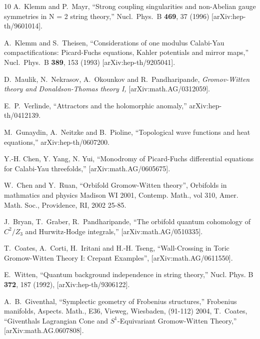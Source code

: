 \documentclass[12pt]{article}
\begin{document}
\begin{thebibliography}{10}
  A.~Klemm and P.~Mayr,
   ``Strong coupling singularities and non-Abelian gauge symmetries in  N = 2
  string theory,'' Nucl.\ Phys.\ B {\bf 469}, 37 (1996)
  [arXiv:hep-th/9601014].



 A.~Klemm and S.~Theisen,
   ``Considerations of one modulus Calabi-Yau compactifications: Picard-Fuchs
   equations, Kahler potentials and mirror maps,''
  Nucl.\ Phys.\ B {\bf 389}, 153 (1993)
  [arXiv:hep-th/9205041].

 D.~Maulik, N.~Nekrasov, A.~Okounkov and R.~Pandharipande,
        {\sl Gromov-Witten theory and Donaldson-Thomas theory I,}
        [arXiv:math.AG/0312059].



  E.~P.~Verlinde,
  ``Attractors and the holomorphic anomaly,''
  arXiv:hep-th/0412139.



  M.~Gunaydin, A.~Neitzke and B.~Pioline,
  ``Topological wave functions and heat equations,''
  arXiv:hep-th/0607200.

 Y.-H. Chen, Y. Yang, N. Yui, ``Monodromy of Picard-Fuchs
differential equations for Calabi-Yau threefolds,'' [arXiv:math.AG/0605675].



 W.~Chen and Y.~Ruan, ``Orbifold Gromow-Witten theory'', Orbifolds in mathmatics and physics
Madison WI 2001, Contemp. Math., vol 310, Amer. Math. Soc., Providence, RI, 2002 25-85.


 J.~Bryan, T.~Graber, R.~Pandharipande, ``The orbifold quantum
cohomology of $C^2/Z_3 $ and Hurwitz-Hodge integrals,'' [arXiv:math.AG/0510335].

 T.~Coates, A.~Corti, H.~Iritani and H.-H. Tseng, ``Wall-Crossing in Toric Gromow-Witten Theory I:
Crepant Examples'', [arXiv:math.AG/0611550].


 E.~Witten, ``Quantum background independence
in string theory,'' Nucl. Phys. B {\bf 372}, 187 (1992), [arXiv:hep-th/9306122].

 A.~B.~Giventhal, ``Symplectic geometry of Frobenius structures,''
Frobenius manifolds, Aspects. Math., E36, Vieweg, Wiesbaden,
(91-112) 2004, T.~Coates, ``Giventhals Lagrangian Cone and
$S^1$-Equivariant Gromow-Witten Theory,'' [arXiv:math.AG.0607808].


\end{thebibliography}
\end{document}
